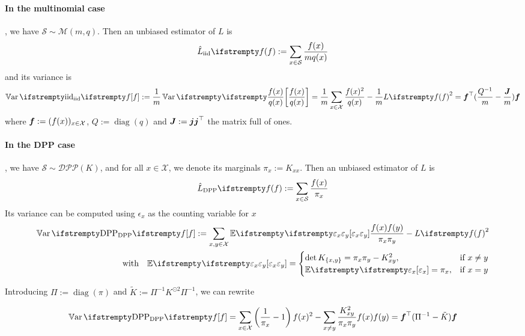 \paragraph{In the multinomial case}, we have $\mathcal S \sim \mathcal M(m, q)$. Then an unbiased estimator of $L$ is
\begin{equation*}
	\estloss{\textrm{iid}}{\query} := \sum_{x\in \mathcal S} \frac{\query(x)}{m q(x)}
\end{equation*}
and its variance is
\begin{equation*}
	\Var{\textrm{iid}}{\query} :=\frac{1}{m} \Var{}{\frac {\query(x)} {q(x)}}
	=\frac{1}{m} \sum_{x \in \mathcal{X}} \frac{\query(x)^{2}}{q(x)} -\frac{1}{m} \loss{\query}^{2} = \boldsymbol\query\T(\frac{Q^{-1}} m - \frac{\moones} m)\boldsymbol\query
\end{equation*}
where $\boldsymbol{f} := (f(x))_{x\in \mathcal{X}}$, $Q := \operatorname{diag}(q)$ and $\boldsymbol{J} := \boldsymbol{j} \boldsymbol{j} ^\top$ the matrix full of ones. 


\paragraph{In the DPP case}, we have $ \mathcal S \sim \mathcal{DPP}(K)$, and for all $x \in \mathcal{X}$, we denote its marginals $\pi_x := K_{xx}$. Then an unbiased estimator of $L$ is
\begin{equation*}
	\estloss{\textrm{DPP}}{\query} := \sum_{x\in \mathcal S} \frac{\query(x)}{\pi_x}
\end{equation*}
Its variance can be computed using $\epsilon_x$ as the counting variable for $x$
\begin{align*}
	\Var{\textrm{DPP}}{\query}
:=\sum_{x,y \in \mathcal{X}}\EE{}{\epsilon_{x} \epsilon_{y}} \frac{\query(x) \query(y)} {\pi_{x} \pi_{y}}  - \loss{\query}^{2}\\
\quad \text{with} \quad
\EE{}{\epsilon_{x} \epsilon_{y}}=
\begin{cases}
	\det K_{\{x, y\}}=\pi_{x} \pi_{y}-K_{xy}^{2}, & \text{if } x \neq y \\
	\EE{}{\epsilon_{x}}=\pi_{x},&\text{if } x = y
\end{cases}
\end{align*}



Introducing $\Pi := \operatorname{diag}(\pi)$ and $\tilde K := \Pi^{-1}K^{\odot 2} \Pi^{-1}$, we can rewrite  

\begin{equation}
	\Var{\textrm{DPP}}{\query}=\sum_{x \in \mathcal{X}}\left(\frac{1}{\pi_{x}}-1\right) \query(x)^{2}-\sum_{x \neq y} \frac{K_{xy}^{2}}{\pi_{x} \pi_{y}} \query(x) \query(y) =  \boldsymbol\query\T (\Pi^{-1}  - \tilde{K}) \boldsymbol\query 
\end{equation}


